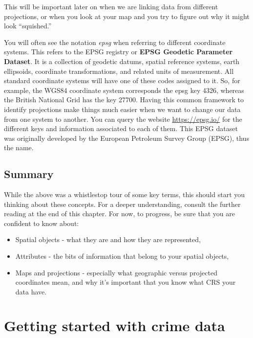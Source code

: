 \documentclass[
]{book}
\providecommand{\tightlist}{%
  \setlength{\itemsep}{0pt}\setlength{\parskip}{0pt}}
\begin{document}
This will be important later on when we are linking data from different projections, or when you look at your map and you try to figure out why it might look ``squished.''

You will often see the notation \emph{epsg} when referring to different coordinate systems. This refers to the EPSG registry or \textbf{EPSG Geodetic Parameter Dataset}. It is a collection of geodetic datums, spatial reference systems, earth ellipsoids, coordinate transformations, and related units of measurement. All standard coordinate systems will have one of these codes assigned to it. So, for example, the WGS84 coordinate system corresponds the epsg key 4326, whereas the British National Grid has the key 27700. Having this common framework to identify projections make things much easier when we want to change our data from one system to another. You can query the website \url{https://epsg.io/} for the different keys and information associated to each of them. This EPSG dataset was originally developed by the European Petroleum Survey Group (EPSG), thus the name.

\hypertarget{summary}{%
\subsection{Summary}\label{summary}}

While the above was a whistlestop tour of some key terms, this should start you thinking about these concepts. For a deeper understanding, consult the further reading at the end of this chapter. For now, to progress, be sure that you are confident to know about:

\begin{itemize}
\tightlist
\item
  Spatial objects - what they are and how they are represented,
\item
  Attributes - the bits of information that belong to your spatial objects,
\item
  Maps and projections - especially what geographic versus projected coordinates mean, and why it's important that you know what CRS your data have.
\end{itemize}

\hypertarget{getting-started-with-crime-data}{%
\section{Getting started with crime data}\label{getting-started-with-crime-data}}
\end{document}
